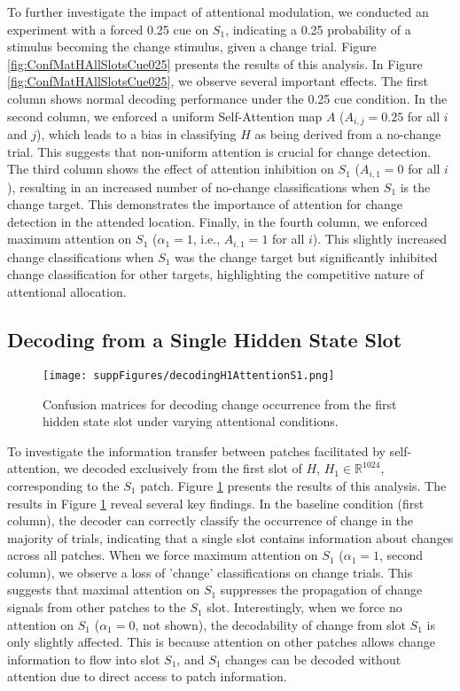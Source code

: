 \documentclass[12pt]{article}
\begin{document}
To further investigate the impact of attentional modulation, we conducted an experiment with a forced 0.25 cue on $S_1$, indicating a 0.25 probability of a stimulus becoming the change stimulus, given a change trial. Figure \ref{fig:ConfMatHAllSlotsCue025} presents the results of this analysis. In Figure \ref{fig:ConfMatHAllSlotsCue025}, we observe several important effects. The first column shows normal decoding performance under the 0.25 cue condition. In the second column, we enforced a uniform Self-Attention map $A$ ($A_{i,j} = 0.25$ for all $i$ and $j$), which leads to a bias in classifying $H$ as being derived from a no-change trial. This suggests that non-uniform attention is crucial for change detection. The third column shows the effect of attention inhibition on $S_1$ ($A_{i,1}=0$ for all $i$), resulting in an increased number of no-change classifications when $S_1$ is the change target. This demonstrates the importance of attention for change detection in the attended location. Finally, in the fourth column, we enforced maximum attention on $S_1$ ($\alpha_1=1$, i.e., $A_{i,1}=1$ for all $i$). This slightly increased change classifications when $S_1$ was the change target but significantly inhibited change classification for other targets, highlighting the competitive nature of attentional allocation.

\subsection{Decoding from a Single Hidden State Slot}

\begin{figure}[htbp]
    \centering
    \texttt{[image: suppFigures/decodingH1AttentionS1.png]}
    \caption{Confusion matrices for decoding change occurrence from the first hidden state slot under varying attentional conditions.}
    \label{fig:ConfMatFirstSlot}
\end{figure}

To investigate the information transfer between patches facilitated by self-attention, we decoded exclusively from the first slot of $H$, $H_1 \in \mathbb{R}^{1024}$, corresponding to the $S_1$ patch. Figure \ref{fig:ConfMatFirstSlot} presents the results of this analysis. The results in Figure \ref{fig:ConfMatFirstSlot} reveal several key findings. In the baseline condition (first column), the decoder can correctly classify the occurrence of change in the majority of trials, indicating that a single slot contains information about changes across all patches. When we force maximum attention on $S_1$ ($\alpha_1=1$, second column), we observe a loss of 'change' classifications on change trials. This suggests that maximal attention on $S_1$ suppresses the propagation of change signals from other patches to the $S_1$ slot. Interestingly, when we force no attention on $S_1$ ($\alpha_1=0$, not shown), the decodability of change from slot $S_1$ is only slightly affected. This is because attention on other patches allows change information to flow into slot $S_1$, and $S_1$ changes can be decoded without attention due to direct access to patch information.
\end{document}
